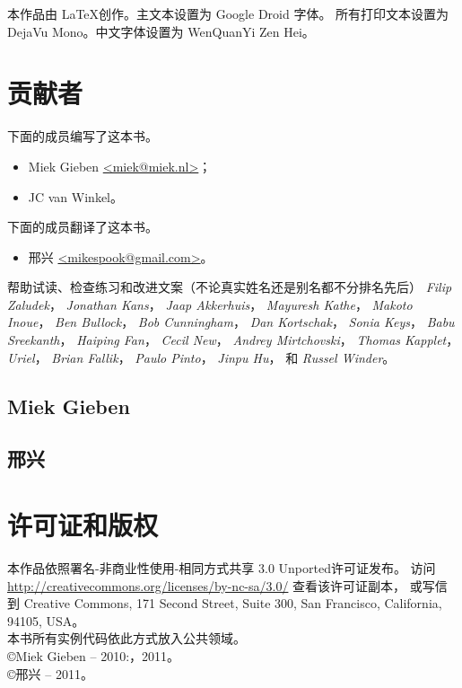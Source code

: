 \noindent{}本作品由 \LaTeX 创作。主文本设置为 Google Droid 字体。
所有打印文本设置为 DejaVu Mono。中文字体设置为 WenQuanYi Zen Hei。

\section{贡献者}
下面的成员编写了这本书。
\begin{itemize}
\item{Miek Gieben \qquad\url{<miek@miek.nl>}}；
\item{JC van Winkel}。
\end{itemize}
下面的成员翻译了这本书。
\begin{itemize}
    \item{邢兴 \qquad\url{<mikespook@gmail.com>}}。
\end{itemize}

帮助试读、检查练习和改进文案（不论真实姓名还是别名都不分排名先后）
\emph{Filip Zaludek}，
\emph{Jonathan Kans}，
\emph{Jaap Akkerhuis}，
\emph{Mayuresh Kathe}，
\emph{Makoto Inoue}，
\emph{Ben Bullock}，
\emph{Bob Cunningham}，
\emph{Dan Kortschak}，
\emph{Sonia Keys}，
\emph{Babu Sreekanth}，
\emph{Haiping Fan}，
\emph{Cecil New}，
\emph{Andrey Mirtchovski}，
\emph{Thomas Kapplet}，
\emph{Uriel}，
\emph{Brian Fallik}，
\emph{Paulo Pinto}，
\emph{Jinpu Hu}，
和 \emph{Russel Winder}。

\subsection{Miek Gieben}


\subsection{邢兴}


\section{许可证和版权}

本作品依照署名-非商业性使用-相同方式共享 3.0 Unported许可证发布。
访问 \url{http://creativecommons.org/licenses/by-nc-sa/3.0/} 查看该许可证副本，
或写信到 Creative Commons, 171 Second Street, Suite 300,
San Francisco, California, 94105, USA。\\
本书所有实例代码依此方式放入公共领域。\\
\copyright Miek Gieben -- 2010:，2011。\\
\copyright 邢兴 -- 2011。
